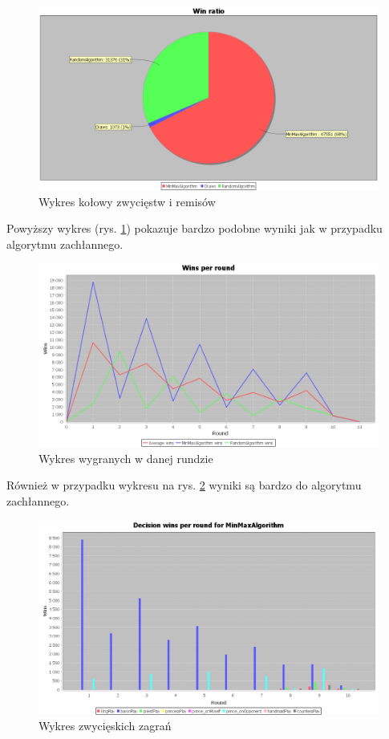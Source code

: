 \begin{figure}[H]
	\centering
	\includegraphics[width=\textwidth]{Resources/MmVsR/MmVsRwin.PNG}
	\caption{Wykres kołowy zwycięstw i remisów} 
	\label{fig:MmVsRwin}
\end{figure}

Powyższy wykres (rys. \ref{fig:MmVsRwin}) pokazuje bardzo podobne wyniki jak w przypadku algorytmu zachłannego.

\begin{figure}[H]
	\centering
	\includegraphics[width=\textwidth]{Resources/MmVsR/MmVsRroundwin.PNG}
	\caption{Wykres wygranych w danej rundzie} 
	\label{fig:MmVsRroundwin}
\end{figure}

Również w przypadku wykresu na rys. \ref{fig:MmVsRroundwin} wyniki są bardzo do algorytmu zachłannego.

\begin{figure}[H]
	\centering
	\includegraphics[width=\textwidth]{Resources/MmVsR/MmVsRdecision.PNG}
	\caption{Wykres zwycięskich zagrań} 
	\label{fig:MmVsRdecision}
\end{figure} 

